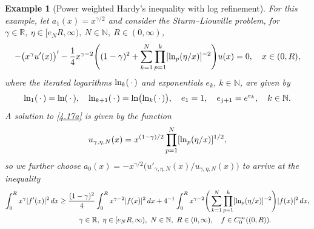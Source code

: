 \documentclass[reqno,10pt,centertags]{amsart}
\newcommand{\bbN}{{\mathbb{N}}}
\newcommand{\bbR}{{\mathbb{R}}}
\newcommand{\g}{\gamma}
\renewcommand{\ln}{\text{\rm ln}}
\numberwithin{equation}{section}
\newtheorem{example}[theorem]{Example}
\theoremstyle{remark}
\begin{document}
\begin{example}[Power weighted Hardy's inequality with log refinement]\label{ex4.2} 
For this example, let $a_1(x)=x^{\g/2}$ and consider the Sturm--Liouville problem, for $\g\in\bbR,\ \eta\in[e_N R,\infty),\ N\in\bbN,\ R\in(0,\infty)$,
\begin{align}\label{4.17a}
-\big(x^\g u'(x)\big)'-\frac{1}{4}x^{\g-2}\Bigg((1-\g)^2+\sum_{k=1}^{N} \prod_{p=1}^{k} [\ln_{p}(\eta/x)]^{-2} \Bigg)u(x)=0,\quad x\in(0,R),
\end{align}
where the iterated logarithms $\ln_k( \, \cdot \, )$ and exponentials $e_k$, $k \in \bbN$, are given by
\begin{equation}\label{4.18a}
\ln_1(\, \cdot \,) = \ln( \, \cdot \, ), \quad \ln_{k+1}( \, \cdot \,) = \ln \big( \ln_k(\, \cdot \,) \big), \quad e_1 =1, \quad e_{j+1} = e^{e_k},\quad k \in \bbN.
\end{equation}
A solution to \eqref{4.17a} is given by the function
\begin{equation}
u_{\g,\eta,N}(x)=x^{(1-\g)/2}\prod_{p=1}^{N} [\ln_{p}(\eta/x)]^{1/2},
\end{equation}
so we further choose $a_0(x)=-x^{\g/2}\big(u'_{\g,\eta,N}(x)/u_{\g,\eta,N}(x)\big)$ to arrive at the inequality \cite[Lemma 2.1]{GPS24}
\begin{align}
\int_0^R x^\g |f'(x)|^2\, dx&\geq \frac{(1-\g)^2}{4} \int_0^R x^{\g-2} |f(x)|^2\, dx +4^{-1}\int_0^R x^{\g-2} \Bigg(\sum_{k=1}^{N} \prod_{p=1}^{k} [\ln_{p}(\eta/x)]^{-2} \Bigg)|f(x)|^2\, dx, \notag\\
&\hspace{1cm} \g\in\bbR,\ \eta\in[e_N R,\infty),\ N\in\bbN,\ R\in(0,\infty),\quad f\in C_0^\infty ((0,R)).
\end{align}
\end{example}
\end{document}
